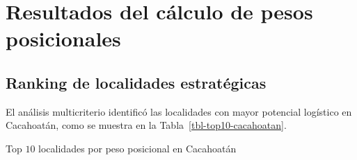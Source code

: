 \documentclass[
  spanish,
  us-letterpaper,
  DIV=11,
  numbers=noendperiod]{scrreprt}
\numberwithin{equation}{section}
\begin{document}
\section{Resultados del cálculo de pesos
posicionales}\label{resultados-del-cuxe1lculo-de-pesos-posicionales}

\subsection{Ranking de localidades
estratégicas}\label{ranking-de-localidades-estratuxe9gicas}

El análisis multicriterio identificó las localidades con mayor potencial
logístico en Cacahoatán, como se muestra en la
Tabla~\ref{tbl-top10-cacahoatan}.

Top \(10\) localidades por peso posicional en Cacahoatán
\end{document}
